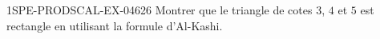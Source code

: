\begin{exercice}{1SPE-PRODSCAL-EX-046}{2}{6}
Montrer que le triangle de cotes $3$, $4$ et $5$ est rectangle en utilisant la formule d'Al-Kashi.
\end{exercice}
